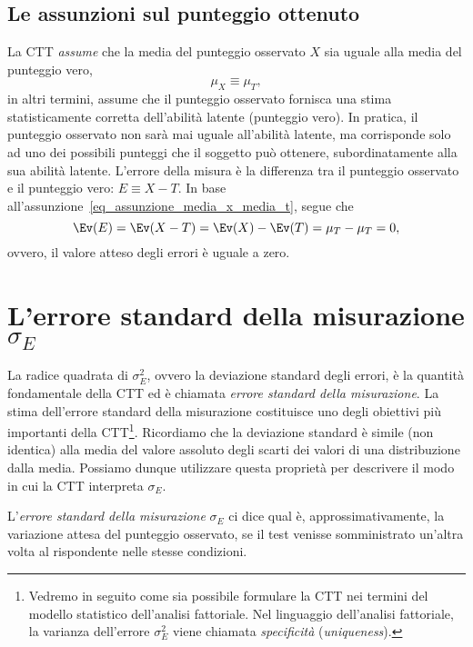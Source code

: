 \subsection{Le assunzioni sul punteggio ottenuto}

La CTT \emph{assume} che la media del punteggio osservato $X$ sia uguale alla media del punteggio vero,
\begin{equation}
\mu_X \equiv \mu_{T},
\label{eq_assunzione_media_x_media_t}
\end{equation}
in altri termini, assume che il punteggio osservato fornisca una stima statisticamente corretta dell'abilità latente (punteggio vero). In pratica, il punteggio osservato non sarà mai uguale all'abilità latente, ma corrisponde solo ad uno dei possibili punteggi che il soggetto può ottenere, subordinatamente alla sua abilità latente. L'errore della misura è la differenza tra il punteggio osservato e il punteggio vero:
$E \equiv X - T.$ In base all'assunzione~\ref{eq_assunzione_media_x_media_t}, segue che 
\[
\Ev(E) = \Ev(X - T) = \Ev(X) - \Ev(T) = \mu_{T} - \mu_{T} = 0,
\]
ovvero, il valore atteso degli errori è uguale a zero.

\section{L'errore standard della misurazione $\sigma_E$}

La radice quadrata di $\sigma^2_E$, ovvero la deviazione standard degli errori, è la quantità fondamentale della CTT ed è chiamata \textit{errore standard della misurazione}. 
La stima  dell'errore standard della misurazione costituisce uno degli obiettivi più importanti della CTT\footnote{Vedremo in seguito come sia possibile formulare la CTT nei termini del modello statistico dell'analisi fattoriale.  Nel linguaggio dell'analisi fattoriale, la varianza dell'errore $\sigma^2_E$ viene chiamata \textit{specificità} (\emph{uniqueness}).}. 
Ricordiamo che la deviazione standard è simile (non identica) alla media del valore assoluto degli scarti dei valori di una distribuzione dalla  media. 
Possiamo dunque utilizzare questa proprietà per descrivere il modo in cui la CTT interpreta $\sigma_E$.
\begin{defn}
L'\textit{errore standard della misurazione} $\sigma_E$ ci dice qual è, approssimativamente, la variazione attesa del punteggio osservato, se il test venisse somministrato un'altra volta al rispondente nelle stesse condizioni.
\end{defn}
 



